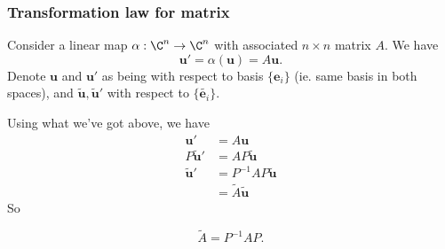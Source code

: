 \documentclass[a4paper]{article}
\begin{document}
      \subsubsection{Transformation law for matrix}
      Consider a linear map $\alpha: \C^n \to \C^n$ with associated $n\times n$ matrix $A$. We have
      \[
        \mathbf{u}' = \alpha(\mathbf{u}) = A\mathbf{u}.
      \]
      Denote $\mathbf{u}$ and $\mathbf{u}'$ as being with respect to basis $\{\mathbf{e}_i\}$ (ie. same basis in both spaces), and $\mathbf{\tilde{u}, \tilde{u}'}$ with respect to $\{\tilde{\mathbf{e}_i}\}$.

      Using what we've got above, we have
      \begin{align*}
        \mathbf{u}' &= A\mathbf{u}\\
        P\mathbf{\tilde{u}'} &= AP\tilde{\mathbf{u}}\\
        \mathbf{\tilde{u}'} &= P^{-1}AP\mathbf{\tilde{u}}\\
        &= \tilde{A}\tilde{\mathbf{u}}
      \end{align*}
      So
      \begin{thm}
        \[
          \tilde{A} = P^{-1}AP.
        \]
      \end{thm}
\end{document}
